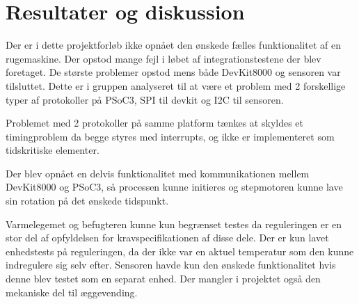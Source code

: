 \section{Resultater og diskussion}

Der er i dette projektforløb ikke opnået den ønskede fælles funktionalitet af en rugemaskine. Der opstod mange fejl i løbet af integrationstestene der blev foretaget. De største problemer opstod mens både DevKit8000 og sensoren var tilsluttet. Dette er i gruppen analyseret til at være et problem med 2 forskellige typer af protokoller på PSoC3, SPI til devkit og I2C til sensoren.

Problemet med 2 protokoller på samme platform tænkes at skyldes et timingproblem da begge styres med interrupts, og ikke er implementeret som tidskritiske elementer.

Der blev opnået en delvis funktionalitet med kommunikationen mellem DevKit8000 og PSoC3, så processen kunne initieres og stepmotoren kunne lave sin rotation på det ønskede tidspunkt. 

Varmelegemet og befugteren kunne kun begrænset testes da reguleringen er en stor del af opfyldelsen for kravspecifikationen af disse dele. Der er kun lavet enhedstests på reguleringen, da der ikke var en aktuel temperatur som den kunne indregulere sig selv efter.
Sensoren havde kun den ønskede funktionalitet hvis denne blev testet som en separat enhed.
Der mangler i projektet også den mekaniske del til æggevending.
